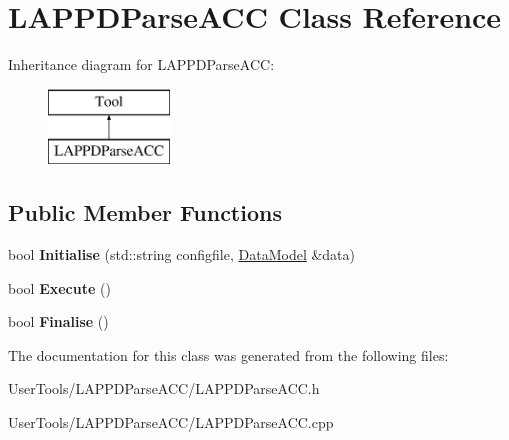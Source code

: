 \hypertarget{classLAPPDParseACC}{\section{L\-A\-P\-P\-D\-Parse\-A\-C\-C Class Reference}
\label{classLAPPDParseACC}
}
Inheritance diagram for L\-A\-P\-P\-D\-Parse\-A\-C\-C\-:\begin{figure}[H]
\begin{center}
\leavevmode
\includegraphics[height=2.000000cm]{classLAPPDParseACC}
\end{center}
\end{figure}
\subsection*{Public Member Functions}
\begin{DoxyCompactItemize}
\item 
\hypertarget{classLAPPDParseACC_acb7a9ca57ebef424c67ee6b2452c865e}{bool {\bfseries Initialise} (std\-::string configfile, \hyperlink{classDataModel}{Data\-Model} \&data)}\label{classLAPPDParseACC_acb7a9ca57ebef424c67ee6b2452c865e}

\item 
\hypertarget{classLAPPDParseACC_a398f4910f5179cc7463302c52a7280fb}{bool {\bfseries Execute} ()}\label{classLAPPDParseACC_a398f4910f5179cc7463302c52a7280fb}

\item 
\hypertarget{classLAPPDParseACC_a27d71df3f3481f978a819ea1830367ae}{bool {\bfseries Finalise} ()}\label{classLAPPDParseACC_a27d71df3f3481f978a819ea1830367ae}

\end{DoxyCompactItemize}


The documentation for this class was generated from the following files\-:\begin{DoxyCompactItemize}
\item 
User\-Tools/\-L\-A\-P\-P\-D\-Parse\-A\-C\-C/L\-A\-P\-P\-D\-Parse\-A\-C\-C.\-h\item 
User\-Tools/\-L\-A\-P\-P\-D\-Parse\-A\-C\-C/L\-A\-P\-P\-D\-Parse\-A\-C\-C.\-cpp\end{DoxyCompactItemize}
